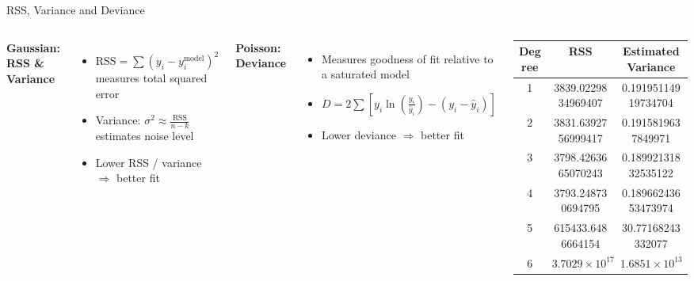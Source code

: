 \documentclass[aspectratio=169]{beamer}
\begin{document}
\begin{frame}{RSS, Variance and Deviance}
\begin{columns}


\textbf{Gaussian: RSS \& Variance}
\begin{itemize}
    \item $\text{RSS} = \sum (y_i - y_i^{\text{model}})^2$ measures total squared error
    \item Variance: $\sigma^2 \approx \frac{\text{RSS}}{n - k}$ estimates noise level
    \item Lower RSS / variance $\Rightarrow$ better fit
\end{itemize}
\vspace{0.2cm}

\textbf{Poisson: Deviance}
\begin{itemize}
    \item Measures goodness of fit relative to a saturated model
    \item $D = 2 \sum \left[y_i \ln\left(\frac{y_i}{\hat{y}_i}\right) - (y_i - \hat{y}_i)\right]$
    \item Lower deviance $\Rightarrow$ better fit
\end{itemize}

\centering

{\scriptsize
\setlength{\tabcolsep}{3pt}

\vspace{2pt}
\begin{tabular}{cc c}
\hline
 \textbf{Degree}&\textbf{RSS} & \textbf{Estimated Variance} \\
\hline
 1&3839.0229834969407 & 0.19195114919734704 \\
 2&3831.6392756999417 & 0.1915819637849971 \\
 3&3798.4263665070243 & 0.18992131832535122 \\
 4&3793.248730694795  & 0.18966243653473974 \\
 5&615433.6486664154  & 30.77168243332077 \\
 6&$3.7029 \times 10^{17}$ & $1.6851 \times 10^{13}$ \\
\hline
\end{tabular}

\vspace{8pt}

\vspace{2pt}

}
\end{columns}
\end{frame}
\end{document}
